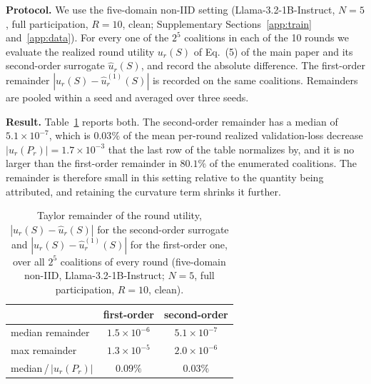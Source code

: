 \documentclass[letterpaper]{article} %
\theoremstyle{plain}
\begin{document}
\textbf{Protocol.} We use the five-domain non-IID setting
(Llama-3.2-1B-Instruct, $N{=}5$, full participation, $R{=}10$, clean;
Supplementary Sections~\ref{app:train} and~\ref{app:data}). For every one of
the $2^5$ coalitions in each of the 10 rounds we
evaluate the realized round utility $u_r(S)$ of Eq.~(5) of the main paper and
its second-order surrogate $\hat u_r(S)$, and record the absolute difference.
The first-order remainder $|u_r(S) - \hat u_r^{(1)}(S)|$ is recorded on the
same coalitions. Remainders are pooled within a seed and averaged over three
seeds.

\textbf{Result.} Table~\ref{tab:taylor} reports both. The
second-order remainder has a median of $5.1\times10^{-7}$, which is $0.03\%$
of the mean per-round realized validation-loss decrease
$|u_r(P_r)| = 1.7\times10^{-3}$ that the last row of the table normalizes by,
and it is no larger than the first-order
remainder in $80.1\%$ of the enumerated coalitions. The remainder is
therefore small in this setting relative to the quantity being attributed,
and retaining the curvature term shrinks it further.

\begin{table}[t]
\centering
\small
\setlength{\tabcolsep}{4pt}
\begin{tabular}{lcc}
\hline
 & first-order & second-order \\
\hline
median remainder & $1.5\times10^{-6}$ & $5.1\times10^{-7}$ \\
max remainder & $1.3\times10^{-5}$ & $2.0\times10^{-6}$ \\
median\,/\,$|u_r(P_r)|$ & $0.09\%$ & $0.03\%$ \\
\hline
\end{tabular}
\caption{Taylor remainder of the round utility, $|u_r(S) - \hat u_r(S)|$ for
the second-order surrogate and $|u_r(S) - \hat u_r^{(1)}(S)|$ for the
first-order one, over all $2^5$ coalitions of every round (five-domain
non-IID, Llama-3.2-1B-Instruct; $N{=}5$, full participation, $R{=}10$,
clean).}
\label{tab:taylor}
\end{table}
\end{document}
